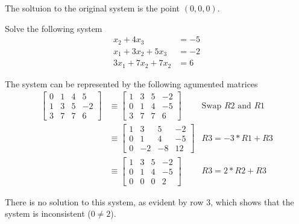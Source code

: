 \documentclass{mathhomework}
\begin{document}
\begin{problem}[1.1\#8]
\begin{solution}
                The soltuion to the original system is the point $(0,0,0)$.
    \end{solution}
\end{problem}

\pagebreak
\begin{problem}[1.1\#11]
    Solve the following system
    \begin{align*}
        x_2 + 4x_3 & = -5 \\
        x_1 + 3x_2 + 5x_3 &= -2 \\
        3x_1 + 7x_2 + 7x_2 &= 6
    \end{align*}

    \begin{solution}
        The system can be represented by the following agumented matrices
        \begin{align*}
            \begin{bmatrix}
                0 & 1 & 4 & 5 \\
                1 & 3 & 5 & -2 \\
                3 & 7 & 7 & 6
            \end{bmatrix}
            & \equiv
            \begin{bmatrix}
                1 & 3 & 5 & -2 \\
                0 & 1 & 4 & -5 \\
                3 & 7 & 7 & 6
            \end{bmatrix}
            & \text{Swap $R2$ and $R1$} \\ & \equiv
            \begin{bmatrix}
                1 & 3 & 5 & -2 \\
                0 & 1 & 4 & -5 \\
                0 & -2 & -8 & 12
            \end{bmatrix}
            & R3 = -3 * R1 + R3 \\ & \equiv
            \begin{bmatrix}
                1 & 3 & 5 & -2 \\
                0 & 1 & 4 & -5 \\
                0 & 0 & 0 & 2
            \end{bmatrix}
            & R3 = 2 * R2 + R3
        \end{align*}
    
        There is no solution to this system, as evident by row 3, which shows that the system is inconsistent ($0\neq2$).
    \end{solution}
\end{problem}
\end{document}
